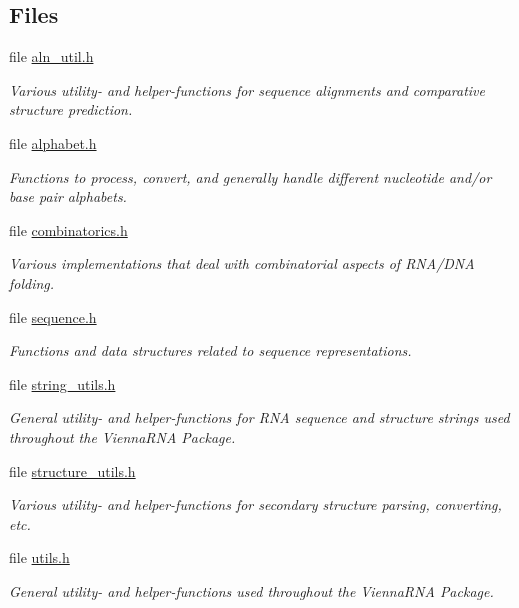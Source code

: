 \subsection*{Files}
\begin{DoxyCompactItemize}
\item 
file \mbox{\hyperlink{aln__util_8h}{aln\+\_\+util.\+h}}
\begin{DoxyCompactList}\small\item\em Various utility-\/ and helper-\/functions for sequence alignments and comparative structure prediction. \end{DoxyCompactList}\item 
file \mbox{\hyperlink{alphabet_8h}{alphabet.\+h}}
\begin{DoxyCompactList}\small\item\em Functions to process, convert, and generally handle different nucleotide and/or base pair alphabets. \end{DoxyCompactList}\item 
file \mbox{\hyperlink{combinatorics_8h}{combinatorics.\+h}}
\begin{DoxyCompactList}\small\item\em Various implementations that deal with combinatorial aspects of R\+N\+A/\+D\+NA folding. \end{DoxyCompactList}\item 
file \mbox{\hyperlink{sequence_8h}{sequence.\+h}}
\begin{DoxyCompactList}\small\item\em Functions and data structures related to sequence representations. \end{DoxyCompactList}\item 
file \mbox{\hyperlink{string__utils_8h}{string\+\_\+utils.\+h}}
\begin{DoxyCompactList}\small\item\em General utility-\/ and helper-\/functions for R\+NA sequence and structure strings used throughout the Vienna\+R\+NA Package. \end{DoxyCompactList}\item 
file \mbox{\hyperlink{structure__utils_8h}{structure\+\_\+utils.\+h}}
\begin{DoxyCompactList}\small\item\em Various utility-\/ and helper-\/functions for secondary structure parsing, converting, etc. \end{DoxyCompactList}\item 
file \mbox{\hyperlink{utils_8h}{utils.\+h}}
\begin{DoxyCompactList}\small\item\em General utility-\/ and helper-\/functions used throughout the {\itshape Vienna\+R\+NA} {\itshape Package}. \end{DoxyCompactList}\end{DoxyCompactItemize}
